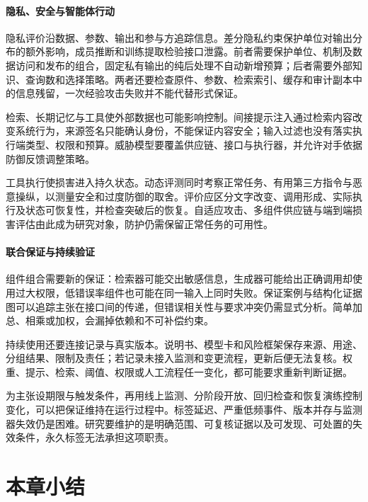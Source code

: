 \paragraph{隐私、安全与智能体行动}

隐私评价沿数据、参数、输出和参与方追踪信息。差分隐私约束保护单位对输出分布的额外影响，成员推断和训练提取检验接口泄露。前者需要保护单位、机制及数据访问和发布的组合，固定私有输出的纯后处理不自动新增预算；后者需要外部知识、查询数和选择策略。两者还要检查原件、参数、检索索引、缓存和审计副本中的信息残留，一次经验攻击失败并不能代替形式保证。

检索、长期记忆与工具使外部数据也可能影响控制。间接提示注入通过检索内容改变系统行为，来源签名只能确认身份，不能保证内容安全；输入过滤也没有落实执行端类型、权限和预算。威胁模型要覆盖供应链、接口与执行器，并允许对手依据防御反馈调整策略。

工具执行使损害进入持久状态。动态评测同时考察正常任务、有用第三方指令与恶意操纵，以测量安全和过度防御的取舍。评价应区分文字改变、调用形成、实际执行及状态可恢复性，并检查突破后的恢复。自适应攻击、多组件供应链与端到端损害评估由此成为研究对象，防护仍需保留正常任务的可用性。

\paragraph{联合保证与持续验证}

组件组合需要新的保证：检索器可能交出敏感信息，生成器可能给出正确调用却使用过大权限，低错误率组件也可能在同一输入上同时失败。保证案例与结构化证据图可以追踪主张在接口间的传递，但错误相关性与要求冲突仍需显式分析。简单加总、相乘或加权，会漏掉依赖和不可补偿约束。

持续使用还要连接记录与真实版本。说明书、模型卡和风险框架保存来源、用途、分组结果、限制及责任；若记录未接入监测和变更流程，更新后便无法复核。权重、提示、检索、阈值、权限或人工流程任一变化，都可能要求重新判断证据。

为主张设期限与触发条件，再用线上监测、分阶段开放、回归检查和恢复演练控制变化，可以把保证维持在运行过程中。标签延迟、严重低频事件、版本并存与监测器失效仍是困难。研究要维护的是明确范围、可复核证据以及可发现、可处置的失效条件，永久标签无法承担这项职责。

\section{本章小结}
\label{sec:trust-foundations-summary}

